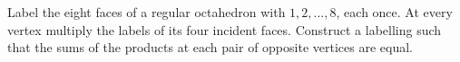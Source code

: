 Label the eight faces of a regular octahedron with $1,2,\ldots,8$, each once. At every vertex multiply the labels of its four incident faces. Construct a labelling such that the sums of the products at each pair of opposite vertices are equal.
